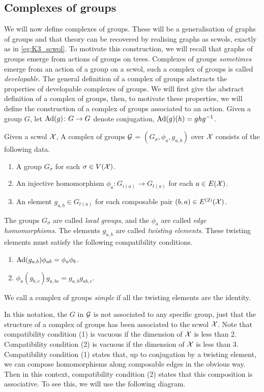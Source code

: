 \subsection{Complexes of groups}
We will now define complexes of groups.
These will be a generalisation of graphs of groups and that theory can be recovered by realising graphs as scwols, exactly as in \cref{eg:K3_scwol}.
To motivate this construction, we will recall that graphs of groups emerge from actions of groups on trees.
Complexes of groups \emph{sometimes} emerge from an action of a group on a scwol, such a complex of groups is called \emph{developable}.
The general definition of a complex of groups abstracts the properties of developable complexes of groups.
We will first give the abstract definition of a complex of groups, then, to motivate these properties, we will define the construction of a complex of groups associated to an action.
Given a group $G$, let $\operatorname{Ad}(g) \colon G \to G$ denote conjugation, $\operatorname{Ad}(g)(h) = ghg^{-1}$.

\begin{definition}
	Given a scwol $\mathcal{X}$, A complex of groups $\mathcal{G}$ = $(G_\sigma, \phi_a, g_{a,b})$ over $\mathcal{X}$ consists of the following data.
	\begin{enumerate}
		\item A group $G_\sigma$ for each $\sigma \in V(\mathcal{X})$.
		\item An injective homomorphism $\phi_a \colon G_{i(a)} \to G_{t(a)}$ for each $a \in E(\mathcal{X})$.
		\item An element $g_{a,b} \in G_{t(a)}$ for each composable pair $(b,a) \in E^{(2)}(\mathcal{X})$.
	\end{enumerate}
	The groups $G_\sigma$ are called \emph{local groups}, and the $\phi_a$ are called \emph{edge homomorphisms}.
	The elements $g_{a,b}$ are called \emph{twisting elements}.
	These twisting elements must satisfy the following compatibility conditions.
	\begin{enumerate}
		\item $\operatorname{Ad}(g_{a,b}) \phi_{ab} = \phi_a \phi_b$.
		\item $\phi_a(g_{b,c})g_{a,bc} = g_{a,b}g_{ab,c}$.
	\end{enumerate}
	We call a complex of groups \emph{simple} if all the twisting elements are the identity.
	\label{def:complex_of_groups}
\end{definition}

In this notation, the $G$ in $\mathcal{G}$ is not associated to any specific group, just that the structure of a complex of groups has been associated to the scwol $\mathcal{X}$.
Note that compatibility condition (1) is vacuous if the dimension of $\mathcal{X}$ is less than 2.
Compatibility condition (2) is vacuous if the dimension of  $\mathcal{X}$ is less than 3.
Compatibility condition (1) states that, up to conjugation by a twisting element, we can compose homomorphisms along composable edges in the obvious way.
Then in this context, compatibility condition (2) states that this composition is associative.
To see this, we will use the following diagram.

